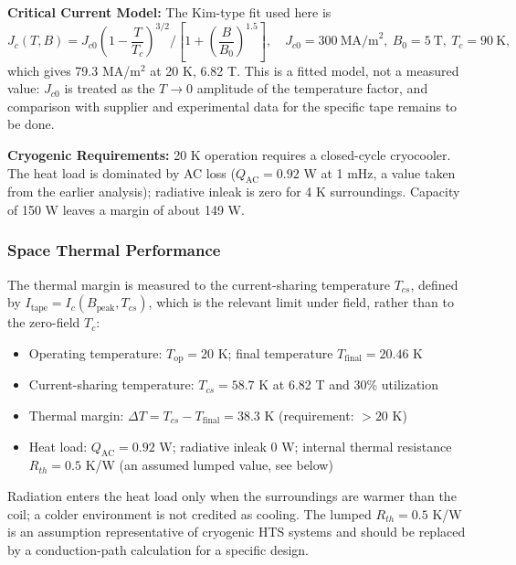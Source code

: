 \documentclass[aps,prb,preprint,amsmath,amssymb]{revtex4-2}
\begin{document}
\textbf{Critical Current Model:} The Kim-type fit used here is
\begin{equation}
J_c(T,B) = J_{c0}\left(1-\frac{T}{T_c}\right)^{3/2}\Big/\left[1+\left(\frac{B}{B_0}\right)^{1.5}\right],\quad J_{c0}=300~\text{MA/m}^2,\ B_0 = 5~\text{T},\ T_c=90~\text{K},
\end{equation}
which gives 79.3 MA/m$^2$ at 20 K, 6.82 T. This is a fitted model, not a measured value: $J_{c0}$ is treated as the $T\to0$ amplitude of the temperature factor, and comparison with supplier and experimental data \cite{superpower2022,hahn2019,larbalestier2014rebco} for the specific tape remains to be done.

\textbf{Cryogenic Requirements:} 20 K operation requires a closed-cycle cryocooler. The heat load is dominated by AC loss ($Q_{\text{AC}} = 0.92$ W at 1 mHz, a value taken from the earlier analysis); radiative inleak is zero for 4 K surroundings. Capacity of 150 W leaves a margin of about 149 W.

\subsubsection{Space Thermal Performance}

The thermal margin is measured to the current-sharing temperature $T_{cs}$, defined by $I_{\text{tape}} = I_c(B_{\text{peak}}, T_{cs})$, which is the relevant limit under field, rather than to the zero-field $T_c$:

\begin{itemize}
\item Operating temperature: $T_{\text{op}} = 20$ K; final temperature $T_{\text{final}} = 20.46$ K
\item Current-sharing temperature: $T_{cs} = 58.7$ K at 6.82 T and 30\% utilization
\item Thermal margin: $\Delta T = T_{cs} - T_{\text{final}} = 38.3$ K (requirement: $>20$ K)
\item Heat load: $Q_{\text{AC}} = 0.92$ W; radiative inleak 0 W; internal thermal resistance $R_{th} = 0.5$ K/W (an assumed lumped value, see below)
\end{itemize}

Radiation enters the heat load only when the surroundings are warmer than the coil; a colder environment is not credited as cooling. The lumped $R_{th} = 0.5$ K/W is an assumption representative of cryogenic HTS systems \cite{iwasa2009cryogenic} and should be replaced by a conduction-path calculation for a specific design.
\end{document}
